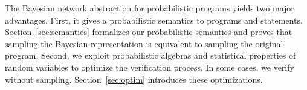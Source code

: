 

The Bayesian network abstraction for probabilistic programs yields two major
advantages.
First, it gives a probabilistic semantics to programs and \passert
statements.
Section~\ref{sec:semantics} formalizes our probabilistic semantics and proves that
sampling the Bayesian representation is equivalent to sampling the original
program.
Second, we exploit 
probabilistic algebras and statistical properties of random variables to optimize the
verification process. In some cases, we verify \passerts without sampling.
Section~\ref{sec:optim} introduces these 
optimizations.


